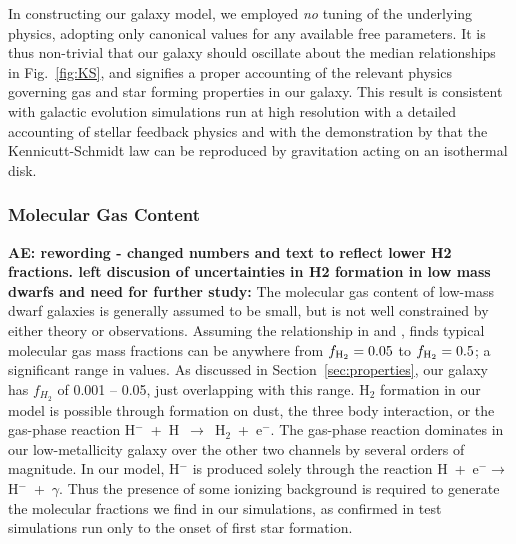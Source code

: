 \documentclass[fleqn,usenatbib,useAMS]{mnras}
\begin{document}
In constructing our galaxy model, we employed \textit{no} tuning of the underlying physics, adopting only canonical values for any available free parameters. It is thus non-trivial that our galaxy should oscillate about the median relationships in Fig.~\ref{fig:KS}, and signifies a proper accounting of the relevant physics governing gas and star forming properties in our galaxy. This result is consistent with galactic evolution simulations run at high resolution with a detailed accounting of stellar feedback physics \citep[see ][ and references therein]{NaabOstriker2017} and with the demonstration by \citet{Li2005} that the Kennicutt-Schmidt law can be reproduced by gravitation acting on an isothermal disk. 

\subsubsection{Molecular Gas Content}
\label{sec:molecular gas content}
\textbf{AE: rewording - changed numbers and text to reflect lower H2 fractions. left discusion of uncertainties in H2 formation in low mass dwarfs and need for further study:}
The molecular gas content of low-mass dwarf galaxies is generally assumed
to be small, but is not well constrained by either theory or observations. Assuming the relationship in \citet{Leroy2013} and \citet{Momose2013}, \citet{Roychowdhury2014} finds typical molecular gas mass fractions can be anywhere from $f_{\rm H_2} = 0.05$ to $f_{\rm H_2} = 0.5$; a significant range in values. As discussed in Section~\ref{sec:properties}, our galaxy has $f_{H_2}$ of 0.001 -- 0.05, just overlapping with this range. H$_2$ formation in our model is possible through formation on dust, the three body interaction, or the gas-phase reaction H$^-$~+~H~$\rightarrow$~H$_2$~+~e$^{-}$. The gas-phase reaction dominates in our low-metallicity galaxy over the other two channels by several orders of magnitude. In our model, H$^{-}$ is produced solely through the reaction H~+~e$^{-} \rightarrow$ H$^{-}$~+~$\gamma$. Thus the presence of some ionizing background is required to generate the molecular fractions we find in our simulations, as confirmed in test simulations run only to the onset of first star formation.
\end{document}
